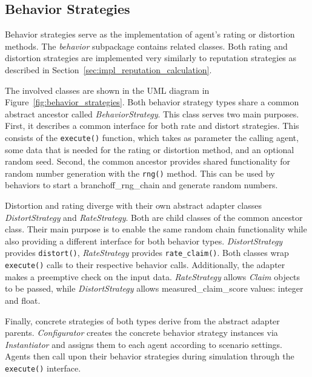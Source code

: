 \documentclass[%
    ]{\PathToTumTemplate/thesis/tum_thesis}
\begin{document}
\subsection{Behavior Strategies}
Behavior strategies serve as the implementation of agent's rating or distortion methods.
The \emph{behavior} subpackage contains related classes.
Both rating and distortion strategies are implemented very similarly to reputation strategies as described in Section~\ref{sec:impl_reputation_calculation}.

The involved classes are shown in the UML diagram in Figure~\ref{fig:behavior_strategies}.
Both behavior strategy types share a common abstract ancestor called \emph{BehaviorStrategy}.
This class serves two main purposes.
First, it describes a common interface for both rate and distort strategies.
This consists of the \lstinline{execute()} function, which takes as parameter the calling agent, some data that is needed for the rating or distortion method, and an optional random seed.
Second, the common ancestor provides shared functionality for random number generation with the \lstinline{rng()} method.
This can be used by behaviors to start a \gls{branchoff_rng_chain} and generate random numbers.

Distortion and rating diverge with their own abstract adapter classes \emph{DistortStrategy} and \emph{RateStrategy}.
Both are child classes of the common ancestor class.
Their main purpose is to enable the same random chain functionality while also providing a different interface for both behavior types.
\emph{DistortStrategy} provides \texttt{distort()}, \emph{RateStrategy} provides \texttt{rate\_claim()}.
Both classes wrap \texttt{execute()} calls to their respective behavior calls.
Additionally, the adapter makes a preemptive check on the input data.
\emph{RateStrategy} allows \emph{Claim} objects to be passed, while \emph{DistortStrategy} allows \gls{measured_claim_score} values: integer and float.

Finally, concrete strategies of both types derive from the abstract adapter parents.
\emph{Configurator} creates the concrete behavior strategy instances via \emph{Instantiator} and assigns them to each agent according to scenario settings.
Agents then call upon their behavior strategies during simulation through the \texttt{execute()} interface.
\end{document}
